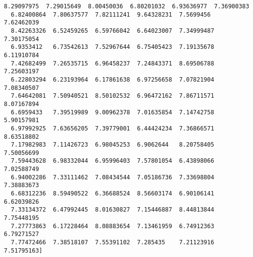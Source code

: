 \documentclass[11pt]{article}
\begin{document}
\begin{Verbatim}[commandchars=\\\{\}]
  8.29097975  7.29015649  8.00450036  6.80201032  6.93636977  7.36900383
  6.82400864  7.80637577  7.82111241  9.64328231  7.5699456   7.62462039
  8.42263326  6.52459265  6.59766042  6.64023007  7.34999487  7.30175054
  6.9353412   6.73542613  7.52967644  6.75405423  7.19135678  6.11910784
  7.42682499  7.26535715  6.96458237  7.24843371  8.69506788  7.25603197
  6.22803294  6.23193964  6.17861638  6.97256658  7.07821904  7.08340507
  7.64642081  7.50940521  8.50102532  6.96472162  7.86711571  8.07167894
  6.6959433   7.39519989  9.00962378  7.01635854  7.14742758  5.90157981
  6.97992925  7.63656205  7.39779001  6.44424234  7.36866571  8.63518802
  7.17982983  7.11426723  6.98045253  6.9062644   8.20758405  7.50056699
  7.59443628  6.98332044  6.95996403  7.57801054  6.43898066  7.02588749
  6.94002286  7.33111462  7.08434544  7.05186736  7.33698804  7.38883673
  6.68312236  8.59490522  6.36688524  8.56603174  6.90106141  6.62039826
  7.33134372  6.47992445  8.01630827  7.15446887  8.44813844  7.75448195
  7.27773863  6.17228464  8.08883654  7.13461959  6.74912363  6.79271527
  7.77472466  7.38518107  7.55391102  7.285435    7.21123916  7.51795163] 
 

\end{Verbatim}
\end{document}
